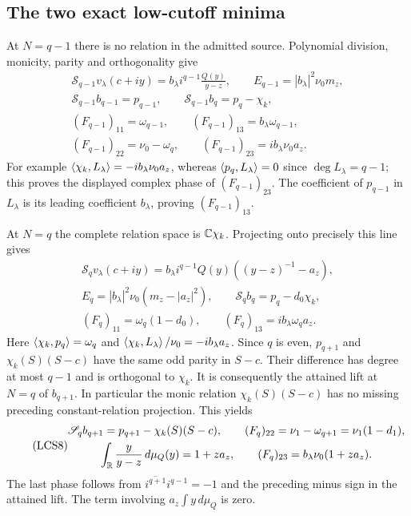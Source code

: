 \subsection{The two exact low-cutoff minima}

At $N=q-1$ there is no relation in the admitted source. Polynomial
division, monicity, parity and orthogonality give
\begin{equation}\tag{LCS6}
\begin{gathered}
 \mathscr S_{q-1}v_\lambda(c+iy)
        =b_\lambda i^{q-1}\frac{Q(y)}{y-z},\qquad
 E_{q-1}=|b_\lambda|^2\nu_0m_z,\\
 \mathscr S_{q-1}b_{q-1}=p_{q-1},\qquad
 \mathscr S_{q-1}b_q=p_q-\chi_k,\\
 (F_{q-1})_{11}=\omega_{q-1},\qquad
 (F_{q-1})_{13}=b_\lambda\omega_{q-1},\\
 (F_{q-1})_{22}=\nu_0-\omega_q,\qquad
 (F_{q-1})_{23}=i b_\lambda\nu_0a_z.
\end{gathered}
\end{equation}
For example $\left\langle\chi_k,L_\lambda\right\rangle=-i b_\lambda\nu_0a_z$,
whereas $\left\langle p_q,L_\lambda\right\rangle=0$ since $\deg L_\lambda=q-1$;
this proves the displayed complex phase of $(F_{q-1})_{23}$.
The coefficient of $p_{q-1}$ in $L_\lambda$ is its leading
coefficient $b_\lambda$, proving $(F_{q-1})_{13}$.

At $N=q$ the complete relation space is $\mathbb C\chi_k$. Projecting
onto precisely this line gives
\begin{equation}\tag{LCS7}
\begin{gathered}
 \mathscr S_qv_\lambda(c+iy)
   =b_\lambda i^{q-1}Q(y)\left((y-z)^{-1}-a_z\right),\\
 E_q=|b_\lambda|^2\nu_0(m_z-|a_z|^2),\qquad
 \mathscr S_qb_q=p_q-d_0\chi_k,\\
 (F_q)_{11}=\omega_q(1-d_0),\qquad
 (F_q)_{13}=i b_\lambda\omega_qa_z.
\end{gathered}
\end{equation}
Here $\left\langle\chi_k,p_q\right\rangle=\omega_q$ and
$\left\langle\chi_k,L_\lambda\right\rangle/\nu_0=-i b_\lambda a_z$.
Since $q$ is even, $p_{q+1}$ and $\chi_k(S)(S-c)$ have the same
odd parity in $S-c$. Their difference has degree at most $q-1$
and is orthogonal to $\chi_k$. It is consequently the attained
lift at $N=q$ of $b_{q+1}$. In particular the monic relation
$\chi_k(S)(S-c)$ has no missing preceding constant-relation
projection. This yields
\begin{equation}\tag{LCS8}
\begin{gathered}
 \mathscr S_qb_{q+1}=p_{q+1}-\chi_k(S)(S-c),\qquad
 (F_q)_{22}=\nu_1-\omega_{q+1}=\nu_1(1-d_1),\\
 \int_\mathbb R\frac{y}{y-z}\,d\mu_Q(y)=1+za_z,\qquad
 (F_q)_{23}=b_\lambda\nu_0(1+za_z).
\end{gathered}
\end{equation}
The last phase follows from
$\overline{i^{q+1}}i^{q-1}=-1$ and the preceding minus sign in
the attained lift. The term involving $a_z\int y\,d\mu_Q$ is zero.

